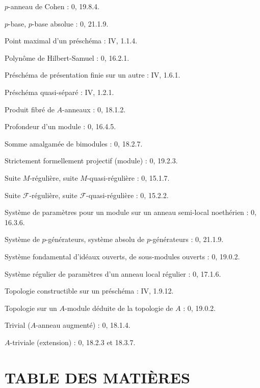 $p$-anneau de Cohen : 0, 19.8.4.\par
$p$-base, $p$-base absolue : 0, 21.1.9.\par
Point maximal d'un préschéma : IV, 1.1.4.\par

\clearpage
{}
Polynôme de Hilbert-Samuel : 0, 16.2.1.\par
Préschéma de présentation finie sur un autre : IV, 1.6.1.\par
Préschéma quasi-séparé : IV, 1.2.1.\par
Produit fibré de $A$-anneaux : 0, 18.1.2.\par
Profondeur d'un module : 0, 16.4.5.\par

Somme amalgamée de bimodules : 0, 18.2.7.\par
Strictement formellement projectif (module) : 0, 19.2.3.\par
Suite $M$-régulière, suite $M$-quasi-régulière : 0, 15.1.7.\par
Suite $\mathscr F$-régulière, suite $\mathscr F$-quasi-régulière : 0, 15.2.2.\par
Système de paramètres pour un module sur un anneau semi-local noethérien : 0, 16.3.6.\par
Système de $p$-générateurs, système absolu de $p$-générateurs : 0, 21.1.9.\par
Système fondamental d'idéaux ouverts, de sous-modules ouverts : 0, 19.0.2.\par
Système régulier de paramètres d'un anneau local régulier : 0, 17.1.6.\par

Topologie constructible sur un préschéma : IV, 1.9.12.\par
Topologie sur un $A$-module déduite de la topologie de $A$ : 0, 19.0.2.\par
Trivial ($A$-anneau augmenté) : 0, 18.1.4.\par
$A$-triviale (extension) : 0, 18.2.3 et 18.3.7.\par

\clearpage
{}
{}
\section*{TABLE DES MATIÈRES}


